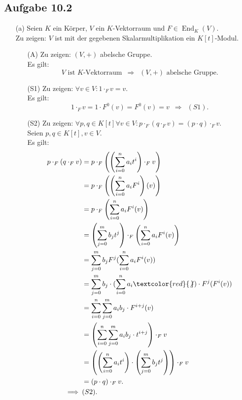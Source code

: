 \documentclass[12pt]{article}
\newcommand{\corr}[1]{\textcolor{red}{#1}}
\newcommand{\df}{\enspace\Longrightarrow\enspace}
\newcommand{\kendo}{\operatorname{End}}
\begin{document}
\subsection*{Aufgabe 10.2}
\begin{enumerate}
	\item[(a)] Seien $K$ ein Körper, $V$ ein $K$-Vektorraum und $F\in\kendo_K(V)$. \\
	Zu zeigen: $V$ ist mit der gegebenen Skalarmultiplikation ein $K[t]$-Modul. \\
	\begin{enumerate}
		\item[(A)] Zu zeigen: $(V,+)$ abelsche Gruppe. \\
		Es gilt: $$V\text{ ist }K\text{-Vektorraum}\df(V,+)\text{ abelsche Gruppe}.$$
		
		\item[(S1)] Zu zeigen: $\forall v\in V:1\cdot_F v=v$. \\
		Es gilt: $$1\cdot_F v=1\cdot F^0(v)=F^0(v)=v\df(S1).$$
		
		\item[(S2)] Zu zeigen: $\forall p,q\in K[t]\forall v\in V: p\cdot_F(q\cdot_F v)=(p\cdot q)\cdot_F v$. \\
		Seien $p,q\in K[t], v\in V$. \\
		Es gilt:
		\begin{align*}
			p\cdot_F(q\cdot_F v)&=p\cdot_F\left(\left(\sum_{i=0}^{n}a_it^i\right)\cdot_F v\right) \\
			&=p\cdot_F\left(\left(\sum_{i=0}^{n}a_iF^i\right)(v)\right) \\
			&=p\cdot_F\left(\sum_{i=0}^{n}a_iF^i(v)\right) \\
			&=\left(\sum_{j=0}^{m}b_jt^j\right)\cdot_F\left(\sum_{i=0}^{n}a_iF^i(v)\right) \\
			&=\sum_{j=0}^{m}b_jF^j(\sum_{i=0}^{n}a_iF^i(v)) \\
			&=\sum_{j=0}^{m}b_j\cdot(\sum_{i=0}^{n}a_i\corr{\not\,})\cdot F^j(F^i(v)) \\
			&=\sum_{i=0}^{n}\sum_{j=0}^{m}a_ib_j\cdot F^{i+j}(v) \\
			&=\left(\sum_{i=0}^{n}\sum_{j=0}^{m}a_ib_j\cdot t^{i+j}\right)\cdot_F v \\
			&=\left(\left(\sum_{i=0}^{n}a_it^i\right)\cdot\left(\sum_{j=0}^{m}b_jt^j\right)\right)\cdot_F v \\
			&=(p\cdot q)\cdot_F v. \\
			\df&(S2).
		\end{align*}
		

\end{enumerate}
\end{enumerate}
\end{document}
